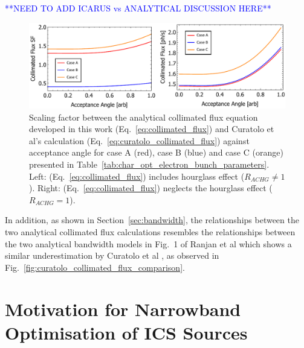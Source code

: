 \documentclass[../main.tex]{subfiles}
\begin{document}
\textcolor{blue}{**NEED TO ADD ICARUS vs ANALYTICAL DISCUSSION HERE**}

\begin{figure}[!h]
\centering
\includegraphics[width=\textwidth]{Figures/Optimisation_and_Characterisation_of_Inverse_Compton_Scattering_Sources/Opt_Char_Fcol_Curatolo_SF_FINAL.pdf}
\caption{Scaling factor between the analytical collimated flux equation developed in this work (Eq.~\ref{eq:collimated_flux}) and Curatolo et al's \cite{curatolo2017analytical} calculation (Eq.~\ref{eq:curatolo_collimated_flux}) against acceptance angle for case A (red), case B (blue) and case C (orange) presented in Table~\ref{tab:char_opt_electron_bunch_parameters}. Left: (Eq.~\ref{eq:collimated_flux}) includes hourglass effect ($R_{ACHG}\neq 1$). Right: (Eq.~\ref{eq:collimated_flux}) neglects the hourglass effect ($R_{ACHG} = 1$).}
\label{fig:curatolo_scaling_factor_comparison}
\end{figure}

In addition, as shown in Section~\ref{sec:bandwidth}, the relationships between the two analytical collimated flux calculations resembles the relationships between the two analytical bandwidth models in Fig.~1 of Ranjan et al \cite{ranjan2018simulation} which shows a similar underestimation by Curatolo et al \cite{curatolo2017analytical}, as observed in Fig.~\ref{fig:curatolo_collimated_flux_comparison}.



\section{Motivation for Narrowband Optimisation of ICS Sources}
\label{sec:motivation_optimisation}
\end{document}
